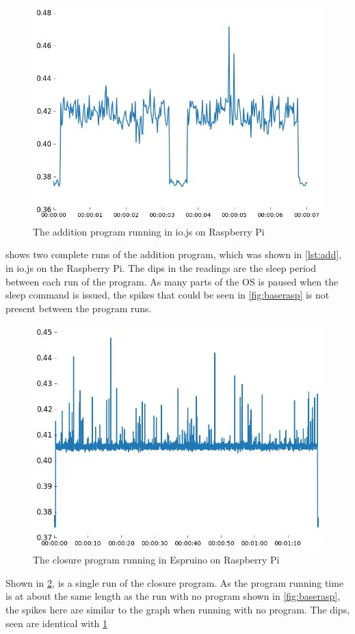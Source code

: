 \begin{figure}[h!]
\centering
\includegraphics[scale=0.6]{fig/graphs/addition_iojs.png}
\caption{The addition program running in io.js on Raspberry Pi}
\label{fig:addraspio}
\end{figure}
 shows two complete runs of the addition program, which was shown in \cref{lst:add}, in io.js on the Raspberry Pi.
The dips in the readings are the sleep period between each run of the program.
As many parts of the OS is paused when the sleep command is issued, the spikes that could be seen in \cref{fig:baserasp} is not present between the program runs.


\begin{figure}[ht]
\centering
\includegraphics[scale=0.6]{fig/graphs/closure_espruino.png}
\caption{The closure program running in Espruino on Raspberry Pi}
\label{fig:closesp}
\end{figure}
Shown in \cref{fig:closesp}, is a single run of the closure program.
As the program running time is at about the same length as the run with no program shown in \cref{fig:baserasp}, the spikes here are similar to the graph when running with no program.
The dips, seen  are identical with \cref{fig:addraspio}


